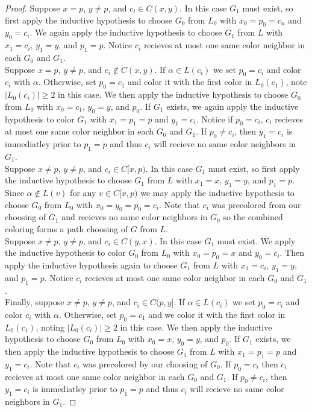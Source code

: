 \documentclass[11pt,letter]{article}
\begin{document}
\begin{proof}
\noindent Suppose $x=p$, $y\ne p$, and $c_i\in C(x,y)$. In this case $G_1$ must exist, so first apply the
inductive hypothesis to choose $G_0$ from $L_0$ with $x_0=p_0=c_n$ and $y_0=c_i$. We again apply the inductive
hypothesis to choose $G_1$ from $L$ with $x_1=c_i$, $y_1=y$, and $p_1=p$. Notice $c_i$ recieves at most one same
color neighbor in each $G_0$ and $G_1$.\\

\noindent Suppose $x=p$, $y\ne p$, and $c_i\not\in C(x,y)$. If
$\alpha\in L(c_i)$ we set $p_0=c_i$ and color $c_i$ with $\alpha$. Otherwise, set $p_0=c_1$ and color it with
the first color in $L_0(c_1)$, note $|L_0(c_i)|\ge 2$ in this case. We then apply the inductive hypothesis to
choose $G_0$ from $L_0$ with $x_0=c_1$, $y_0=y$, and $p_0$. If $G_1$ exists, we again apply the inductive
hypothesis to color $G_1$ with $x_1=p_1=p$ and $y_1=c_i$. Notice if $p_0=c_i$, $c_i$ recieves at most one same
color neighbor in each $G_0$ and $G_1$. If $p_0\ne c_i$, then $y_1=c_i$ is immediatley prior to
$p_1=p$ and thus $c_i$ will recieve no same color neighbors in $G_1$.\\

\noindent Suppose $x\ne p$, $y\ne p$, and $c_i\in C[x,p)$. In this case $G_1$ must exist, so first apply
the inductive hypothesis to choose $G_1$ from $L$ with $x_1=x$, $y_1=y$, and $p_1=p$.
Since $\alpha\not\in L(v)$ for any $v\in C[x,p)$ we may apply the inductive hypothesis to choose $G_0$ from
$L_0$ with $x_0=y_0=p_0=c_i$. Note that $c_i$ was precolored from our choosing of $G_1$ and recieves
no same color neighbors in $G_0$ so the combined coloring forms a path choosing of $G$ from $L$.\\

\noindent Suppose $x\ne p$, $y\ne p$, and $c_i\in C(y,x)$. In this case $G_1$ must exist. We apply
the inductive hypothesis to color $G_0$ from $L_0$ with $x_0=p_0=x$ and $y_0=c_i$. Then apply the inductive
hypothesis again to choose $G_1$ from $L$ with $x_1=c_i$, $y_1=y$, and $p_1=p$. Notice $c_i$ recieves at most
one same color neighbor in each $G_0$ and $G_1$.\\

\noindent Finally, suppose $x\ne p$, $y\ne p$, and $c_i\in C(p,y]$. If
$\alpha\in L(c_i)$ we set $p_0=c_i$ and color $c_i$ with $\alpha$. Otherwise, set $p_0=c_1$ and we color it with
the first color in $L_0(c_1)$, noting $|L_0(c_i)|\ge 2$ in this case. We then apply the inductive hypothesis to
choose $G_0$ from $L_0$ with $x_0=x$, $y_0=y$, and $p_0$. If $G_1$ exists, we then apply the inductive
hypothesis to choose $G_1$ from $L$ with $x_1=p_1=p$ and $y_1=c_i$. Note that $c_i$ was precolored by our
choosing of $G_0$. If $p_0=c_i$ then $c_i$ recieves at most one same
color neighbor in each $G_0$ and $G_1$. If $p_0\ne c_i$, then $y_1=c_i$ is immediatley prior to
$p_1=p$ and thus $c_i$ will recieve no same color neighbors in $G_1$.
\end{proof}
\end{document}
